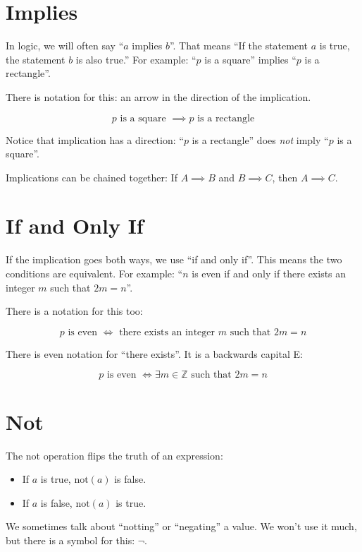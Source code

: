 \section{Implies}

In logic, we will often say ``$a$ implies $b$''.  That means ``If the
statement $a$ is true, the statement $b$ is also true.''  For example:
``$p$ is a square'' implies ``$p$ is a rectangle''.

There is notation for this: an arrow in the direction of the implication.

$$p \text{ is a square } \implies p \text{ is a rectangle}$$

Notice that implication has a direction: ``$p$ is a rectangle'' does \textit{not} imply 
``$p$ is a square''.

Implications can be chained together: If $A \implies B$ and $B \implies C$,  then $A \implies C$.

\section {If and Only If}

If the implication goes both ways, we use ``if and only if''.  This
means the two conditions are equivalent.  For example: ``$n$ is even
if and only if there exists an integer $m$ such that $2m = n$''. 

There is a notation for this too:

$$p \text{ is even } \iff \text{ there exists an integer } m \text{ such that } 2m = n$$

There is even notation for ``there exists''. It is a backwards capital E:

$$p \text{ is even } \iff \exists m \in \mathbb{Z}  \text{ such that } 2m = n$$

\section {Not}

The not operation flips the truth of an expression:
\begin{itemize}
\item If $a$ is true, $\text{not}(a)$ is false.

\item If $a$ is false, $\text{not}(a)$ is true.
\end{itemize}

We sometimes talk about ``notting'' or ``negating'' a value.  We won't
use it much, but there is a symbol for this: $\neg$.

